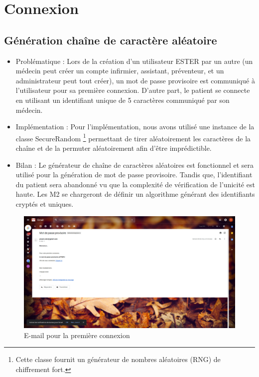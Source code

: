 \section{Connexion}

\subsection{Génération chaîne de caractère aléatoire}
    
\begin{itemize} 
\item Problématique :
Lors de la création d’un utilisateur ESTER par un autre (un médecin peut créer un compte infirmier, assistant, préventeur, et un administrateur peut tout créer), un mot de passe provisoire est communiqué à l’utilisateur pour sa première connexion.
D’autre part, le patient se connecte en utilisant un identifiant unique de 5 caractères communiqué par son médecin.
\item  Implémentation :
Pour l’implémentation, nous avons utilisé une instance de la classe SecureRandom \footnote{Cette classe fournit un générateur de nombres aléatoires (RNG) de chiffrement fort.} permettant de tirer aléatoirement les caractères de la chaîne et de la permuter aléatoirement afin d’être imprédictible.
\item  Bilan :
Le générateur de chaîne de caractères aléatoires est fonctionnel et sera utilisé pour la génération de mot de passe provisoire. Tandis que, l’identifiant du patient sera abandonné vu que la complexité de vérification de l’unicité est haute. Les M2 se chargeront de définir un algorithme générant des identifiants cryptés et uniques.

\end{itemize}

\begin{figure}[H]
    \begin{center}
	\includegraphics[scale=0.25]{img/connexion/mailCo}
    \end{center}
    \caption{E-mail pour la première connexion}
\end{figure}

